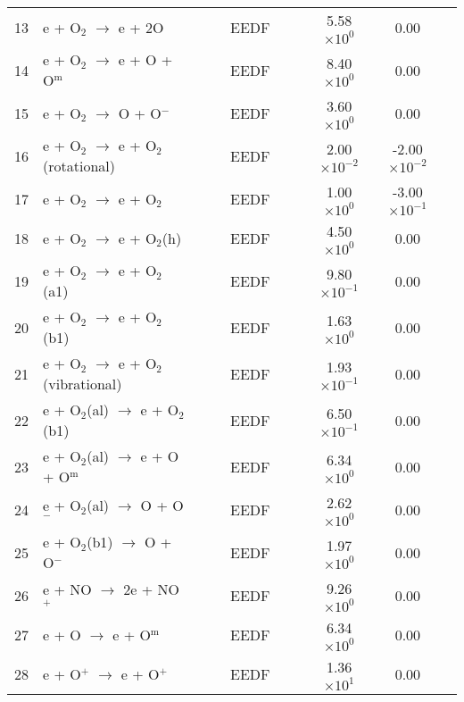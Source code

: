 \documentclass{article}
\begin{document}
\begin{table}[H]
{\begin{tabu}{clcccccccc}
      13 & e + O$_{2}$ $\rightarrow$ e + 2O &  & & EEDF & & & 5.58$\times 10^{0}$ & 0.00 & \cite{lopez2003electron} \\
      14 & e + O$_{2}$ $\rightarrow$ e + O + O$^\text{m}$ &  & & EEDF & & & 8.40$\times 10^{0}$ & 0.00 & \cite{ionin2007physics} \\
      15 & e + O$_{2}$ $\rightarrow$ O + O$^{-}$ &  & & EEDF & & & 3.60$\times 10^{0}$ & 0.00 & \cite{ionin2007physics} \\
      16 & e + O$_{2}$ $\rightarrow$ e + O$_{2}$(rotational) &  & & EEDF & & & 2.00$\times 10^{-2}$ & -2.00$\times 10^{-2}$ & \cite{ionin2007physics} \\
      17 & e + O$_{2}$ $\rightarrow$ e + O$_{2}$ &  & & EEDF & & & 1.00$\times 10^{0}$ & -3.00$\times 10^{-1}$ & \cite{ionin2007physics} \\
      18 & e + O$_{2}$ $\rightarrow$ e + O$_{2}$(h) &  & & EEDF & & & 4.50$\times 10^{0}$ & 0.00 & \cite{ionin2007physics} \\
      19 & e + O$_{2}$ $\rightarrow$ e + O$_{2}$(a1) &  & & EEDF & & & 9.80$\times 10^{-1}$ & 0.00 & \cite{ionin2007physics} \\
      20 & e + O$_{2}$ $\rightarrow$ e + O$_{2}$(b1) &  & & EEDF & & & 1.63$\times 10^{0}$ & 0.00 & \cite{ionin2007physics} \\
      21 & e + O$_{2}$ $\rightarrow$ e + O$_{2}$(vibrational) &  & & EEDF & & & 1.93$\times 10^{-1}$ & 0.00 & \cite{ionin2007physics} \\
      22 & e + O$_{2}$(al) $\rightarrow$ e + O$_{2}$(b1) &  & & EEDF & & & 6.50$\times 10^{-1}$ & 0.00 & \cite{ionin2007physics} \\
      23 & e + O$_{2}$(al) $\rightarrow$ e + O + O$^\text{m}$ &  & & EEDF & & & 6.34$\times 10^{0}$ & 0.00 & \cite{ionin2007physics} \\
      24 & e + O$_{2}$(al) $\rightarrow$ O + O$^{-}$ &  & & EEDF & & & 2.62$\times 10^{0}$ & 0.00 & \cite{ionin2007physics} \\
      25 & e + O$_{2}$(b1) $\rightarrow$ O + O$^{-}$ &  & & EEDF & & & 1.97$\times 10^{0}$ & 0.00 & \cite{ionin2007physics} \\
      26 & e + NO $\rightarrow$ 2e + NO$^{+}$ &  & & EEDF & & & 9.26$\times 10^{0}$ & 0.00 & \cite{kim2002ionization} \\
      27 & e + O $\rightarrow$ e + O$^\text{m}$ &  & & EEDF & & & 6.34$\times 10^{0}$ & 0.00 & \cite{yuan2003computational} \\
      28 & e + O$^{+}$ $\rightarrow$ e + O$^{+}$ &  & & EEDF & & & 1.36$\times 10^{1}$ & 0.00 & \cite{yuan2003computational} \\

\end{tabu}}
\end{table}
\end{document}
